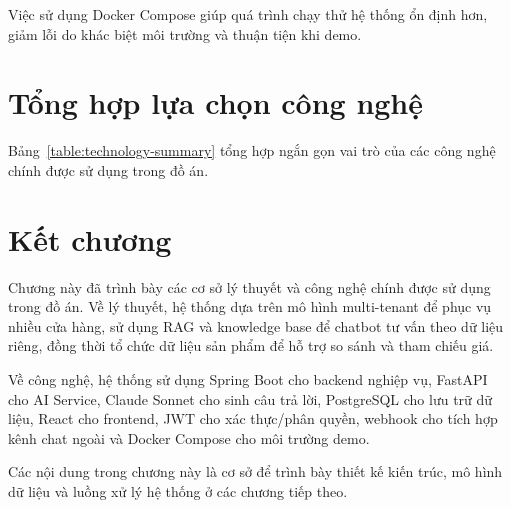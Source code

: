 \documentclass[../DoAn.tex]{subfiles}
\begin{document}
Việc sử dụng Docker Compose giúp quá trình chạy thử hệ thống ổn định hơn, giảm lỗi do khác biệt môi trường và thuận tiện khi demo.

\section{Tổng hợp lựa chọn công nghệ}
\label{section:3.3}

Bảng~\ref{table:technology-summary} tổng hợp ngắn gọn vai trò của các công nghệ chính được sử dụng trong đồ án.

\begin{table}[H]
\centering
\caption{Tổng hợp công nghệ sử dụng trong hệ thống}
\label{table:technology-summary}
\end{table}

\section{Kết chương}
\label{section:3.ket_chuong}

Chương này đã trình bày các cơ sở lý thuyết và công nghệ chính được sử dụng trong đồ án. Về lý thuyết, hệ thống dựa trên mô hình multi-tenant để phục vụ nhiều cửa hàng, sử dụng RAG và knowledge base để chatbot tư vấn theo dữ liệu riêng, đồng thời tổ chức dữ liệu sản phẩm để hỗ trợ so sánh và tham chiếu giá.

Về công nghệ, hệ thống sử dụng Spring Boot cho backend nghiệp vụ, FastAPI cho AI Service, Claude Sonnet cho sinh câu trả lời, PostgreSQL cho lưu trữ dữ liệu, React cho frontend, JWT cho xác thực/phân quyền, webhook cho tích hợp kênh chat ngoài và Docker Compose cho môi trường demo.

Các nội dung trong chương này là cơ sở để trình bày thiết kế kiến trúc, mô hình dữ liệu và luồng xử lý hệ thống ở các chương tiếp theo.
\end{document}
